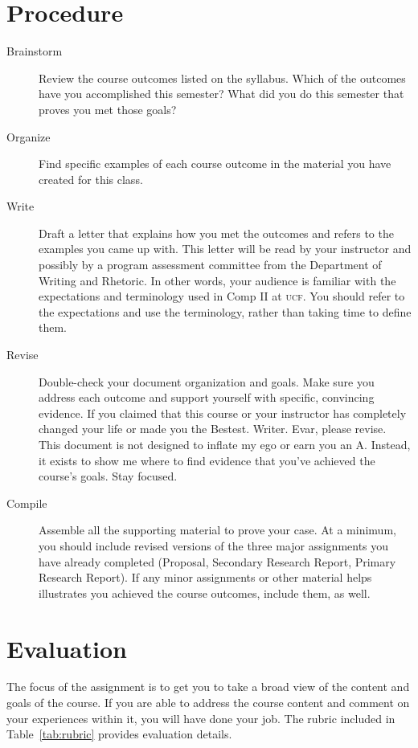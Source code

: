 \documentclass[9pt,twocolumn,oneside]{amsart}	%
\begin{document}
\section{Procedure} %
\label{sec:procedure}
\begin{description}
	\item[Brainstorm] Review the course outcomes listed on the syllabus. Which of the outcomes have you accomplished this semester? What did you do this semester that proves you met those goals?
	\item[Organize] Find specific examples of each course outcome in the material you have created for this class.
	\item[Write] Draft a letter that explains how you met the outcomes and refers to the examples you came up with. This letter will be read by your instructor and possibly by a program assessment committee from the Department of Writing and Rhetoric. In other words, your audience is familiar with the expectations and terminology used in Comp II at \textsc{ucf}. You should refer to the expectations and use the terminology, rather than taking time to define them.
	\item[Revise] Double-check your document organization and goals. Make sure you address each outcome and support yourself with specific, convincing evidence. If you claimed that this course or your instructor has completely changed your life or made you the Bestest. Writer. Evar\texttrademark{}, please revise. This document is not designed to inflate my ego or earn you an A. Instead, it exists to show me where to find evidence that you've achieved the course's goals. Stay focused.
	\item[Compile] Assemble all the supporting material to prove your case. At a minimum, you should include revised versions of the three major assignments you have already completed (Proposal, Secondary Research Report, Primary Research Report). If any minor assignments or other material helps illustrates you achieved the course outcomes, include them, as well.
\end{description}

\section{Evaluation} %
\label{sec:rubric}
The focus of the assignment is to get you to take a broad view of the content and goals of the course. If you are able to address the course content and comment on your experiences within it, you will have done your job. The rubric included in Table~\ref{tab:rubric} provides evaluation details.




\end{document}
